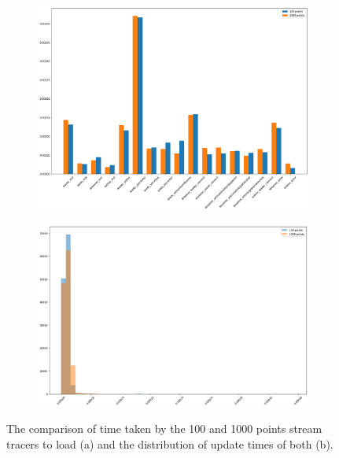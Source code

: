 \begin{figure}
    \centering
    \begin{subfigure}{.9\textwidth}
        \centering
        \includegraphics[width=\textwidth]{pictures/analysis stream tracer 1000/output_18_1.png}
        \caption{}
    \end{subfigure}
    \begin{subfigure}{.9\textwidth}
        \centering
        \includegraphics[width=\textwidth]{pictures/analysis stream tracer 1000/output_17_1.png}
        \caption{}
    \end{subfigure}
    \caption{The comparison of time taken by the 100 and 1000 points stream tracers to load (a) and the distribution of update times of both (b).}
    \label{fig:stream-tracer-1000-profiling}
\end{figure}
